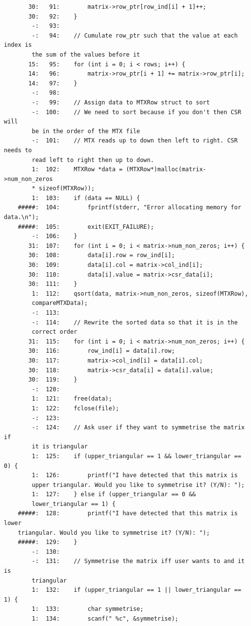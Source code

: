 \documentclass[12pt]{article}
\begin{document}
\begin{mdframed}[style=myboxstyleTerminal1]
\begin{verbatim}
       30:   91:        matrix->row_ptr[row_ind[i] + 1]++;
       30:   92:    }
        -:   93:
        -:   94:    // Cumulate row_ptr such that the value at each index is
        the sum of the values before it
       15:   95:    for (int i = 0; i < rows; i++) {
       14:   96:        matrix->row_ptr[i + 1] += matrix->row_ptr[i];
       14:   97:    }
        -:   98:
        -:   99:    // Assign data to MTXRow struct to sort
        -:  100:    // We need to sort because if you don't then CSR will 
        be in the order of the MTX file
        -:  101:    // MTX reads up to down then left to right. CSR needs to 
        read left to right then up to down.
        1:  102:    MTXRow *data = (MTXRow*)malloc(matrix->num_non_zeros 
        * sizeof(MTXRow));
        1:  103:    if (data == NULL) {
    #####:  104:        fprintf(stderr, "Error allocating memory for data.\n");
    #####:  105:        exit(EXIT_FAILURE);
        -:  106:    }
       31:  107:    for (int i = 0; i < matrix->num_non_zeros; i++) {
       30:  108:        data[i].row = row_ind[i];
       30:  109:        data[i].col = matrix->col_ind[i];
       30:  110:        data[i].value = matrix->csr_data[i];
       30:  111:    }
        1:  112:    qsort(data, matrix->num_non_zeros, sizeof(MTXRow), 
        compareMTXData);
        -:  113:
        -:  114:    // Rewrite the sorted data so that it is in the 
        correct order
       31:  115:    for (int i = 0; i < matrix->num_non_zeros; i++) {
       30:  116:        row_ind[i] = data[i].row;
       30:  117:        matrix->col_ind[i] = data[i].col;
       30:  118:        matrix->csr_data[i] = data[i].value;
       30:  119:    }
        -:  120:
        1:  121:    free(data);
        1:  122:    fclose(file);
        -:  123:
        -:  124:    // Ask user if they want to symmetrise the matrix if 
        it is triangular
        1:  125:    if (upper_triangular == 1 && lower_triangular == 0) {
        1:  126:        printf("I have detected that this matrix is 
        upper triangular. Would you like to symmetrise it? (Y/N): ");
        1:  127:    } else if (upper_triangular == 0 && 
        lower_triangular == 1) {
    #####:  128:        printf("I have detected that this matrix is lower 
    triangular. Would you like to symmetrise it? (Y/N): ");
    #####:  129:    }
        -:  130:
        -:  131:    // Symmetrise the matrix iff user wants to and it is 
        triangular
        1:  132:    if (upper_triangular == 1 || lower_triangular == 1) {
        1:  133:        char symmetrise;
        1:  134:        scanf(" %c", &symmetrise);

\end{verbatim}
\end{mdframed}
\end{document}
